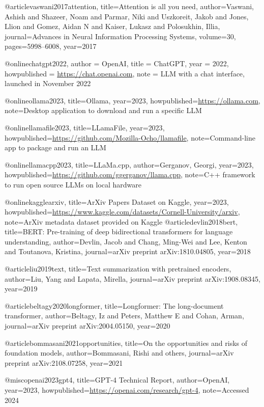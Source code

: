 @article{vaswani2017attention,
  title={Attention is all you need},
  author={Vaswani, Ashish and Shazeer, Noam and Parmar, Niki and Uszkoreit, Jakob and Jones, Llion and Gomez, Aidan N and Kaiser, Lukasz and Polosukhin, Illia},
  journal={Advances in Neural Information Processing Systems},
  volume={30},
  pages={5998--6008},
  year={2017}
}


@online{chatgpt2022,
  author = {{OpenAI}},
  title = {{ChatGPT}},
  year = {2022},
  howpublished = {\url{https://chat.openai.com}},
  note = {LLM with a chat interface, launched in November 2022}
}


@online{ollama2023,
  title={{Ollama}},
  year={2023},
  howpublished={\url{https://ollama.com}},
  note={Desktop application to download and run a specific LLM}
}

@online{llamafile2023,
  title={{LLamaFile}},
  year={2023},
  howpublished={\url{https://github.com/Mozilla-Ocho/llamafile}},
  note={Command-line app to package and run an LLM}
}


@online{llamacpp2023,
  title={{LLaMa.cpp}},
  author={Gerganov, Georgi},
  year={2023},
  howpublished={\url{https://github.com/ggerganov/llama.cpp}},
  note={C++ framework to run open source LLMs on local hardware}
}

@online{kagglearxiv,
  title={{ArXiv Papers Dataset on Kaggle}},
  year={2023},
  howpublished={\url{https://www.kaggle.com/datasets/Cornell-University/arxiv}},
  note={ArXiv metadata dataset provided on Kaggle}
}
@article{devlin2018bert,
  title={BERT: Pre-training of deep bidirectional transformers for language understanding},
  author={Devlin, Jacob and Chang, Ming-Wei and Lee, Kenton and Toutanova, Kristina},
  journal={arXiv preprint arXiv:1810.04805},
  year={2018}
}

@article{liu2019text,
  title={Text summarization with pretrained encoders},
  author={Liu, Yang and Lapata, Mirella},
  journal={arXiv preprint arXiv:1908.08345},
  year={2019}
}

@article{beltagy2020longformer,
  title={Longformer: The long-document transformer},
  author={Beltagy, Iz and Peters, Matthew E and Cohan, Arman},
  journal={arXiv preprint arXiv:2004.05150},
  year={2020}
}

@article{bommasani2021opportunities,
  title={On the opportunities and risks of foundation models},
  author={Bommasani, Rishi and others},
  journal={arXiv preprint arXiv:2108.07258},
  year={2021}
}

@misc{openai2023gpt4,
  title={GPT-4 Technical Report},
  author={OpenAI},
  year={2023},
  howpublished={\url{https://openai.com/research/gpt-4}},
  note={Accessed 2024}
}

